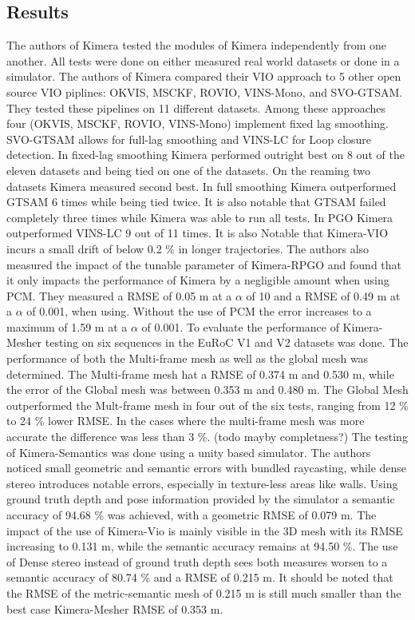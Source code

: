 \documentclass[11pt,a4paper]{article}
\begin{document}
\subsection{Results}
The authors of Kimera tested the modules of Kimera independently from one another. 
All tests were done on either measured real world datasets or done in a simulator.
The authors of Kimera compared their VIO approach to 5 other open source VIO piplines: OKVIS, MSCKF, ROVIO, VINS-Mono, and SVO-GTSAM.
They tested these pipelines on 11 different datasets.
Among these approaches four (OKVIS, MSCKF, ROVIO, VINS-Mono) implement fixed lag smoothing. 
SVO-GTSAM allows for full-lag smoothing and VINS-LC for Loop closure detection. 
In fixed-lag smoothing Kimera performed outright best on 8 out of the eleven datasets and being tied on one of the datasets. 
On the reaming two datasets Kimera measured second best.
In full smoothing Kimera outperformed GTSAM 6 times while being tied twice. 
It is also notable that GTSAM failed completely three times while Kimera was able to run all tests.
In PGO Kimera outperformed VINS-LC 9 out of 11 times. 
It is also Notable that Kimera-VIO incurs a small drift of below 0.2 $\%$ in longer trajectories. 
The authors also measured the impact of the tunable parameter of Kimera-RPGO and found that it only impacts the performance of Kimera by a negligible amount when using PCM.
They measured a RMSE of 0.05 m at a $\alpha$ of 10 and a RMSE of 0.49 m at a $\alpha$ of 0.001, when using. 
Without the use of PCM the error increases to a maximum of 1.59 m at a $\alpha$ of 0.001. 
To evaluate the performance of Kimera-Mesher testing on six sequences in the EuRoC V1 and V2 datasets was done. 
The performance of both the Multi-frame mesh as well as the global mesh was determined. 
The Multi-frame mesh hat a RMSE of 0.374 m and 0.530 m, while the error of the Global mesh was between 0.353 m and 0.480 m.
The Global Mesh outperformed the Mult-frame mesh in four out of the six tests, ranging from 12 \% to 24 \% lower RMSE.
In the cases where the multi-frame mesh was more accurate the difference was less than 3 \%.
(todo mayby completness?)
The testing of Kimera-Semantics was done using a unity based simulator. 
The authors noticed small geometric and semantic errors with bundled raycasting, while dense stereo introduces notable errors, especially in texture-less areas like walls. 
Using ground truth depth and pose information provided by the simulator a semantic accuracy of 94.68 \% was achieved, with a geometric RMSE of 0.079 m.
The impact of the use of Kimera-Vio is mainly visible in the 3D mesh with its RMSE increasing to 0.131 m, while the semantic accuracy remains at 94.50 \%. 
The use of Dense stereo instead of ground truth depth sees both measures worsen to a semantic accuracy of 80.74 \% and a RMSE of 0.215 m.
It should be noted that the RMSE of the metric-semantic mesh of 0.215 m is still much smaller than the best case Kimera-Mesher RMSE of 0.353 m.
\end{document}
